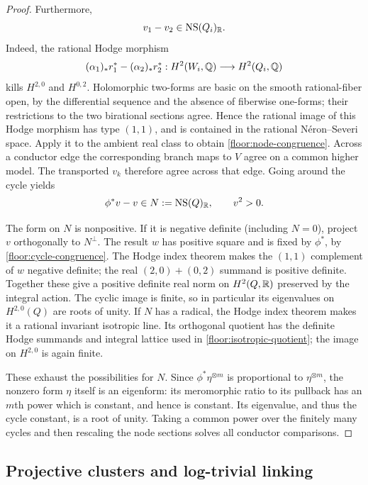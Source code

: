 \begin{proof}
Furthermore,
\begin{equation}
 \label{floor:node-congruence}
 v_1-v_2\in\operatorname{NS}(Q_i)_{\mathbb{R}}.
\end{equation}
Indeed, the rational Hodge morphism
\[
 (\alpha_1)_*r_1^*-(\alpha_2)_*r_2^*
 :H^2(W_i,\mathbb{Q})\longrightarrow H^2(Q_i,\mathbb{Q})
\]
kills $H^{2,0}$ and $H^{0,2}$.  Holomorphic two-forms are
basic on the smooth rational-fiber open, by the differential
sequence and the absence of fiberwise one-forms; their
restrictions to the two birational sections agree.  Hence
the rational image of this Hodge morphism has type $(1,1)$,
and is contained in the rational N\'eron--Severi space.
Apply it to the ambient real class to obtain
\eqref{floor:node-congruence}.  Across a conductor edge the
corresponding branch maps to $V$ agree on a common higher
model.  The transported $v_k$ therefore agree across that
edge.  Going around the cycle yields
\begin{equation}
 \label{floor:cycle-congruence}
 \phi^*v-v\in N:=\operatorname{NS}(Q)_{\mathbb{R}},\qquad v^2>0.
\end{equation}

The form on $N$ is nonpositive.  If it is negative definite
(including $N=0$), project $v$ orthogonally to $N^\perp$.
The result $w$ has positive square and is fixed by $\phi^*$,
by \eqref{floor:cycle-congruence}.  The Hodge index theorem
makes the $(1,1)$ complement of $w$ negative definite;
the real $(2,0)+(0,2)$ summand is positive definite.
Together these give a positive definite real norm on
$H^2(Q,\mathbb{R})$ preserved by the integral action.  The cyclic
image is finite, so in particular its eigenvalues on
$H^{2,0}(Q)$ are roots of unity.  If $N$ has a radical,
the Hodge index theorem makes it a rational invariant
isotropic line.  Its orthogonal quotient has the definite
Hodge summands and integral lattice used in
\eqref{floor:isotropic-quotient}; the image on $H^{2,0}$
is again finite.

These exhaust the possibilities for $N$.  Since
$\phi^*\eta^{\otimes m}$ is proportional to
$\eta^{\otimes m}$, the nonzero form $\eta$ itself is an
eigenform: its meromorphic ratio to its pullback has an
$m$th power which is constant, and hence is constant.
Its eigenvalue, and thus the cycle constant, is a root of
unity.  Taking a common power over the finitely many
cycles and then rescaling the node sections solves all
conductor comparisons.
\end{proof}

\subsection{Projective clusters and log-trivial linking}

